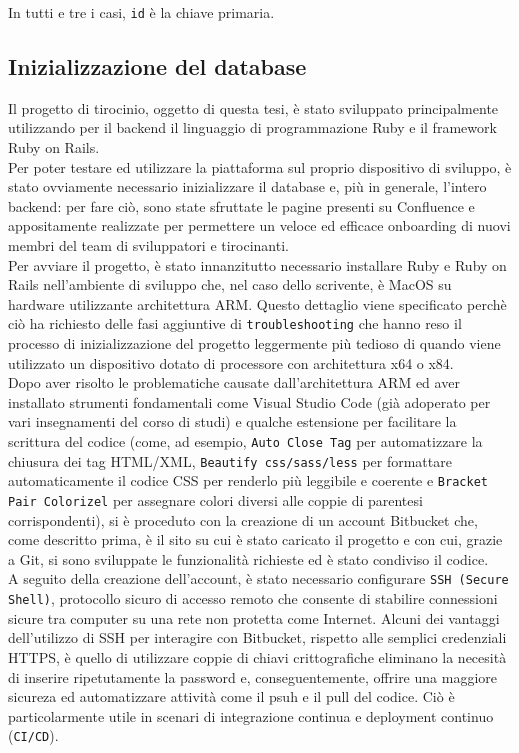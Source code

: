 \documentclass[a4paper, 12pt]{book}
\begin{document}
In tutti e tre i casi, \texttt{id} è la chiave primaria.

\newpage

\subsection{Inizializzazione del database}

Il progetto di tirocinio, oggetto di questa tesi, è stato sviluppato principalmente utilizzando per il backend il linguaggio
di programmazione Ruby e il framework Ruby on Rails.\\

Per poter testare ed utilizzare la piattaforma sul proprio dispositivo di sviluppo, è stato ovviamente necessario
inizializzare il database e, più in generale, l'intero backend: per fare ciò, sono state sfruttate le pagine presenti su
Confluence e appositamente realizzate per permettere un veloce ed efficace onboarding di nuovi membri del team di sviluppatori
e tirocinanti.\\

Per avviare il progetto, è stato innanzitutto necessario installare Ruby e Ruby on Rails nell'ambiente di sviluppo che, nel caso
dello scrivente, è MacOS su hardware utilizzante architettura ARM. Questo dettaglio viene specificato perchè ciò ha richiesto
delle fasi aggiuntive di \texttt{troubleshooting} che hanno reso il processo di inizializzazione del progetto leggermente più
tedioso di quando viene utilizzato un dispositivo dotato di processore con architettura x64 o x84.\\

Dopo aver risolto le problematiche causate dall'architettura ARM ed aver installato strumenti fondamentali come Visual Studio
Code (già adoperato per vari insegnamenti del corso di studi) e qualche estensione per facilitare la scrittura del codice (come,
ad esempio, \texttt{Auto Close Tag} per automatizzare la chiusura dei tag HTML/XML, \texttt{Beautify css/sass/less} per
formattare automaticamente il codice CSS per renderlo più leggibile e coerente e \texttt{Bracket Pair Colorizel} per assegnare
colori diversi alle coppie di parentesi corrispondenti), si è proceduto con la creazione di un account Bitbucket che, come
descritto prima, è il sito su cui è stato caricato il progetto e con cui, grazie a Git, si sono sviluppate le funzionalità
richieste ed è stato condiviso il codice.\\

A seguito della creazione dell'account, è stato necessario configurare \texttt{SSH (Secure Shell)}, protocollo sicuro
di accesso remoto che consente di stabilire connessioni sicure tra computer su una rete non protetta come Internet. Alcuni
dei vantaggi dell'utilizzo di SSH per interagire con Bitbucket, rispetto alle semplici credenziali HTTPS, è quello di
utilizzare coppie di chiavi crittografiche eliminano la necesità di inserire ripetutamente la password e, conseguentemente,
offrire una maggiore sicureza ed automatizzare attività come il psuh e il pull del codice. Ciò è particolarmente utile in
scenari di integrazione continua e deployment continuo (\texttt{CI/CD}).\\
\end{document}
